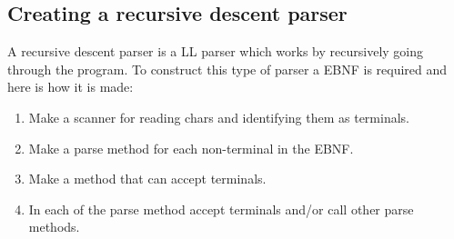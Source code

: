 	\subsection{Creating a recursive descent parser}
		A recursive descent parser is a LL parser which works by recursively going through the program.
		To construct this type of parser a EBNF is required and here is how it is made:
		\begin{enumerate}
			\item Make a scanner for reading chars and identifying them as terminals.
			\item Make a parse method for each non-terminal in the EBNF.
			\item Make a method that can accept terminals.
			\item In each of the parse method accept terminals and/or call other parse methods.
		\end{enumerate}		
	
		
		
		